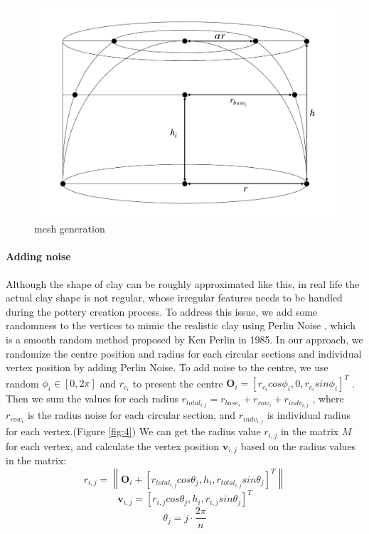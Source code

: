 \begin{figure}
  \includegraphics[width=\textwidth]{fig3.pdf}
\caption{mesh generation}
\label{fig:3}       %
\end{figure}

\paragraph{Adding noise} Although the shape of clay can be roughly approximated like this, in real life the actual clay shape is not regular, whose irregular features needs to be handled during the pottery creation process. To address this issue, we add some randomness to the vertices to mimic the realistic clay using Perlin Noise \cite{Perlin1985An}, which is a smooth random method proposed by Ken Perlin in 1985.
In our approach, we randomize the centre position and radius for each circular sections and individual vertex position by adding Perlin Noise.
To add noise to the centre, we use random $\phi_{i} \in [0, 2\pi]$ and $r_{c_{i}}$ to present the centre
$\mathbf{O}_{i} = \left[r_{c_{i}}cos\phi_{i}, 0, r_{c_{i}}sin\phi_{i}\right]^T$
. Then we sum the values for each radius
$r_{total_{i,j}} = r_{base_{i}} + r_{row_{i}} + r_{indv_{i,j}}$
, where $r_{row_{i}}$ is the radius noise for each circular section, and $r_{indv_{i,j}}$ is individual radius for each vertex.(Figure \ref{fig:4}) We can get the radius value $r_{i,j}$ in the matrix $M$ for each vertex, and calculate the vertex position $\mathbf{v}_{i,j}$ based on the radius values in the matrix:
\begin{equation}
r_{i,j} = \left\|
\mathbf{O}_{i} + \left[ r_{total_{i,j}} cos \theta_{j},
h_{i},
r_{total_{i,j}} sin \theta_{j}
\right]^T
\right\| 
\end{equation}
\begin{equation}
\mathbf{v}_{i,j} =
\left[r_{i,j}  cos \theta_{j},
h_{i},
r_{i,j} sin \theta_{j}\right]^T
\end{equation}
\begin{equation}
\theta_{j} = j \cdot \frac{2\pi}{n}
\end{equation}

